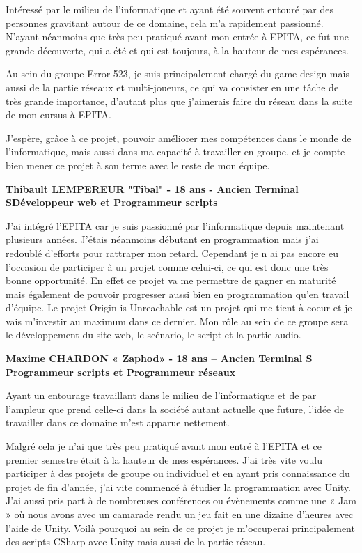 \documentclass[12pt,a4paper]{article}
\begin{document}
Intéressé par le milieu de l'informatique et ayant été souvent entouré par des personnes gravitant autour de ce domaine, cela m'a rapidement passionné. N'ayant néanmoins que très peu pratiqué avant mon entrée à EPITA, ce fut une grande découverte, qui a été et qui est toujours, à la hauteur de mes espérances.

Au sein du groupe Error 523, je suis principalement chargé du game design mais aussi de la partie réseaux et multi-joueurs, ce qui va consister en une tâche de très grande importance, d'autant plus que j'aimerais faire du réseau dans la suite de mon cursus à EPITA.
   
J'espère, grâce à ce projet, pouvoir améliorer mes compétences dans le monde de l'informatique, mais aussi dans ma capacité à travailler en groupe, et je compte bien mener ce projet à son terme avec le reste de mon équipe.

\begin{center}
\textbf{Thibault LEMPEREUR "Tibal" - 18 ans - Ancien Terminal S\newline Développeur web et Programmeur scripts}

\end{center}

J'ai intégré l'EPITA car je suis passionné par l'informatique depuis maintenant plusieurs années. J'étais néanmoins débutant en programmation mais j'ai redoublé d'efforts pour rattraper mon retard. Cependant je n ai pas encore eu l'occasion de participer à un projet comme celui-ci, ce qui est donc une très bonne opportunité. En effet ce projet va me permettre de gagner en maturité mais également de pouvoir progresser aussi bien en programmation qu'en travail d'équipe. Le projet Origin is Unreachable est un projet qui me tient à coeur et je vais m'investir au maximum dans ce dernier. Mon rôle au sein de ce groupe sera le développement du site web, le scénario, le script et la partie audio. 
\newpage
\begin{center}
\textbf{Maxime CHARDON « Zaphod» - 18 ans – Ancien Terminal S
Programmeur scripts et Programmeur réseaux}
\end{center}

Ayant un entourage travaillant dans le milieu de l’informatique et de par l’ampleur que prend celle-ci dans la société autant actuelle que future, l’idée de travailler dans ce domaine m'est apparue nettement.

Malgré cela je n’ai que très peu pratiqué avant mon entré à l’EPITA et ce premier semestre était à la hauteur de mes espérances. J’ai très vite voulu participer à des projets de groupe ou individuel et en ayant pris connaissance du projet de fin d’année, j’ai vite commencé à étudier la programmation avec Unity. J’ai aussi pris part à de nombreuses conférences ou évènements comme une « Jam » où nous avons avec un camarade rendu un jeu fait en une dizaine d’heures avec l’aide de Unity. Voilà pourquoi au sein de ce projet je m’occuperai principalement des scripts CSharp avec Unity mais aussi de la partie réseau.
\end{document}
